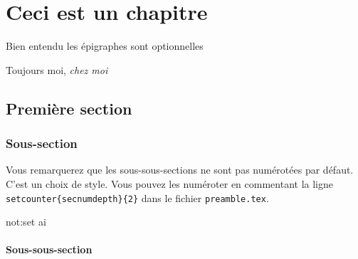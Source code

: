 \chapter{Ceci est un chapitre}

\epigraph{Bien entendu les épigraphes sont optionnelles}{Toujours moi, \textit{chez moi}}

\section{Première section}


\subsection{Sous-section}
Vous remarquerez que les sous-sous-sections ne sont pas numérotées par défaut. C'est un choix de style. Vous pouvez les numéroter en commentant la ligne \texttt{\\setcounter\{secnumdepth\}\{2\}} dans le fichier \texttt{preamble.tex}.

\gls{not:set}
\gls{ai}

\subsubsection{Sous-sous-section}
\lipsum[1-8]
